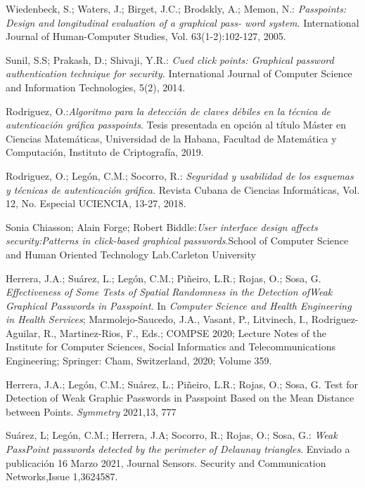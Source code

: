 \documentclass[12pt]{report}
\begin{document}

\begin{thebibliography}{9}
	\normalsize{
		 Wiedenbeck, S.; Waters, J.; Birget, J.C.; Brodskly, A.; Memon, N.:\textit{ Passpoints: Design and
		longitudinal evaluation of a graphical pass- word system}. International Journal of Human-Computer
		Studies, Vol. 63(1-2):102-127, 2005.
	
		 Sunil, S.S; Prakash, D.; Shivaji, Y.R.:\textit{ Cued click points: Graphical password authentication technique
		for security.} International Journal of Computer Science and Information Technologies, 5(2), 2014.
	
		 Rodriguez, O.:\textit{Algoritmo para la detección de claves débiles en la técnica de autenticación gráfica passpoints}. Tesis presentada en opción al título Máster en Ciencias Matemáticas, Universidad de la
		Habana, Facultad de Matemática y Computación, Instituto de Criptografía, 2019.
	
		 Rodriguez, O.; Legón, C.M.; Socorro, R.: \textit{Seguridad y usabilidad de los esquemas y técnicas de autenticación gráfica.} Revista Cubana de Ciencias Informáticas, Vol. 12, No. Especial UCIENCIA,
		13-27, 2018.
		
		 Sonia Chiasson; Alain Forge; Robert Biddle:\textit{User interface design affects security:Patterns in
		click-based graphical passwords}.School of Computer Science and Human Oriented Technology
		Lab.Carleton University
		
		Herrera, J.A.; Suárez, L.; Legón, C.M.; Piñeiro, L.R.; Rojas, O.; Sosa, G.\textit{ Effectiveness of Some Tests of Spatial Randomness in the Detection ofWeak Graphical Passwords in Passpoint}. In \textit{Computer Science and Health Engineering in Health Services}; Marmolejo-Saucedo, J.A., Vasant, P., Litvinech, I., Rodriguez-Aguilar, R., Martinez-Rios, F., Eds.; COMPSE 2020; Lecture Notes of the Institute for Computer Sciences, Social Informatics and Telecommunications Engineering; Springer: Cham, Switzerland, 2020; Volume 359.
		
		Herrera, J.A.; Legón, C.M.; Suárez, L.; Piñeiro, L.R.; Rojas, O.; Sosa, G. Test for Detection of Weak Graphic Passwords in Passpoint Based on the Mean Distance between Points.\textit{ Symmetry} 2021,13, 777
		
		Suárez, L; Legón, C.M.; Herrera, J.A; Socorro, R.; Rojas, O.; Sosa,
		G.: \textit{Weak PassPoint passwords detected by the perimeter of Delaunay triangles}. Enviado a publicación 16 Marzo 2021, Journal Sensors. Security and Communication Networks,Issue 1,3624587.
		
}
\end{thebibliography}
\end{document}
